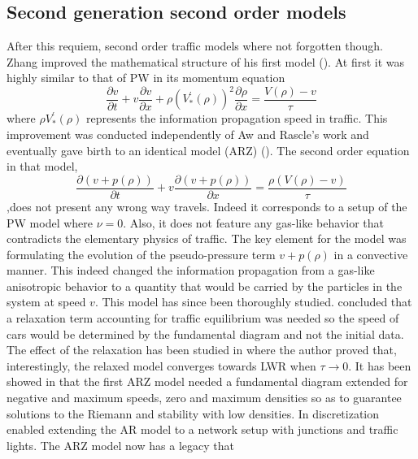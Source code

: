 \documentclass[preprint]{elsarticle}
\begin{document}
\subsection{Second generation second order models}
After this requiem, second order traffic models where not forgotten
though. Zhang improved the mathematical structure of his first model
(\cite{Zhang1998}). At first it was highly similar to that of PW
in its momentum equation 
\begin{equation}
\frac{\partial v}{\partial t}+v\frac{\partial v}{\partial x}+\rho\left(V_{*}^{'}\left(\rho\right)\right)^{2}\frac{\partial\rho}{\partial x}=\frac{V\left(\rho\right)-v}{\tau}
\end{equation}
where $\rho V_{*}^{'}\left(\rho\right)$ represents the information
propagation speed in traffic. This improvement was conducted independently
of Aw and Rascle's work and eventually gave birth to an identical
model (ARZ) (\cite{AR,Z}). The second order equation in that model,
\begin{equation}
\frac{\partial\left(v+p\left(\rho\right)\right)}{\partial t}+v\frac{\partial\left(v+p\left(\rho\right)\right)}{\partial x}=\frac{\rho\left(V\left(\rho\right)-v\right)}{\tau}
\end{equation}
,does not present any wrong way travels. Indeed it corresponds to a
setup of the PW model where $\nu=0$. Also, it does not feature any
gas-like behavior that contradicts the elementary physics of traffic.
The key element for the model was formulating the evolution of the
pseudo-pressure term $v+p\left(\rho\right)$ in a convective manner.
This indeed changed the information propagation from a gas-like anisotropic
behavior to a quantity that would be carried by the particles in the
system at speed $v$. This model has since been thoroughly studied.
\cite{AR} concluded that a relaxation term accounting for traffic
equilibrium was needed so the speed of cars would be determined by
the fundamental diagram and not the initial data. The effect of the
relaxation has been studied in \cite{R_improved} where the author
proved that, interestingly, the relaxed model converges towards LWR
when $\tau\rightarrow0$. It has been showed in \cite{Lebacque2007}
that the first ARZ model needed a fundamental diagram extended for
negative and maximum speeds, zero and maximum densities so as to guarantee
solutions to the Riemann and stability with low densities. In \cite{HybridLagrangian2007}
discretization enabled extending the AR model to a network setup with
junctions and traffic lights. The ARZ model now has a legacy that
\end{document}
